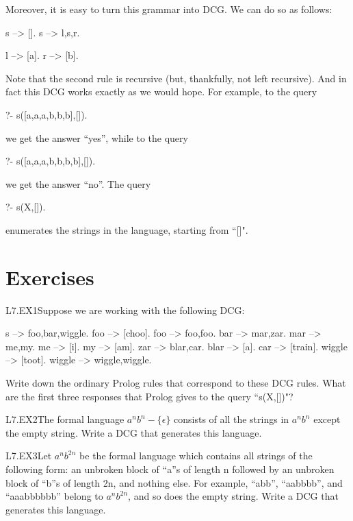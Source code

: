 Moreover, it is easy to turn this grammar into DCG. We can do so as
follows:
\begin{LPNcodedisplay}
s --> [].
s --> l,s,r.

l --> [a].
r --> [b].
\end{LPNcodedisplay}
Note that the second rule is recursive (but, thankfully, not left
recursive).  And in fact this DCG works exactly as we would hope. For
example, to the query
\begin{LPNcodedisplay}
?- s([a,a,a,b,b,b],[]).
\end{LPNcodedisplay}
we get the answer ``yes'', while to the query
\begin{LPNcodedisplay}
?- s([a,a,a,b,b,b,b],[]).
\end{LPNcodedisplay}
we get the answer ``no''. The query
\begin{LPNcodedisplay}
?- s(X,[]).
\end{LPNcodedisplay}
enumerates  the strings in the language, starting
from ``[]".


\section{Exercises}\label{SEC.L7.EXERCISES}

\begin{LPNexercise}{L7.EX1}Suppose we are working with the following DCG:
\begin{LPNcodedisplay}
s --> foo,bar,wiggle.
foo --> [choo].
foo --> foo,foo.
bar --> mar,zar.
mar --> me,my.
me --> [i].
my --> [am].
zar --> blar,car.
blar --> [a].
car --> [train].
wiggle --> [toot].
wiggle --> wiggle,wiggle.
\end{LPNcodedisplay}
Write down the ordinary Prolog rules that correspond to these
DCG rules.
What are the first three responses that Prolog gives to the query
``s(X,[])"?
\end{LPNexercise}


\begin{LPNexercise}{L7.EX2}The formal language $a^nb^n - \{\epsilon\}$ consists of all the strings in
$a^nb^n$ except the empty string. Write a DCG that generates this
language.
\end{LPNexercise}


\begin{LPNexercise}{L7.EX3}Let $a^nb^{2n}$ be the formal language which contains all strings of
the following form: an unbroken block of ``a''s of length n
followed by an unbroken block of ``b''s of length 2n, and
nothing else. For example, ``abb'', ``aabbbb'', and ``aaabbbbbb''
belong to $a^nb^{2n}$, and so does the empty string.  Write a DCG that
generates this language.
 \end{LPNexercise}


